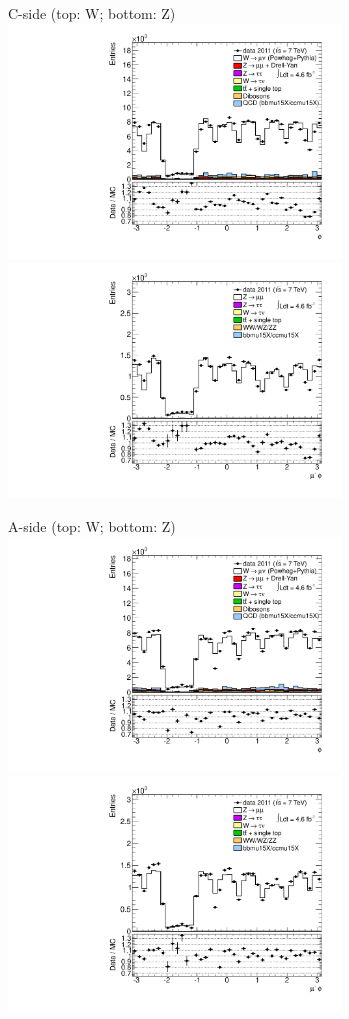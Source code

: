 {

\colb[T]

C-side (top: W; bottom: Z)
\centering
\includegraphics[width=0.66\textwidth]{dates/20130306/figures/etaphi/W_4_C_stack_l_phi_NEG} \\
\includegraphics[width=0.66\textwidth]{dates/20130306/figures/etaphi/Z_4_C_stack_lN_phi_ALL.pdf}

A-side (top: W; bottom: Z)
\centering
\includegraphics[width=0.66\textwidth]{dates/20130306/figures/etaphi/W_4_A_stack_l_phi_NEG} \\
\includegraphics[width=0.66\textwidth]{dates/20130306/figures/etaphi/Z_4_A_stack_lN_phi_ALL.pdf} 

\cole
}


